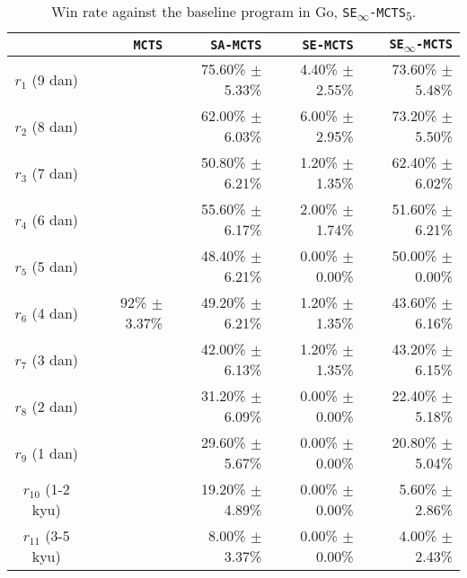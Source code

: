 \begin{table}[b]
        \centering
        \caption{Win rate against the baseline program in Go, \texttt{SE\textsubscript{$\infty$}-MCTS\textsubscript{$5$}}.}
        \begin{small}
        \begin{tabular}{crrrr}
            \toprule
            & \texttt{MCTS} & \texttt{SA-MCTS} & \texttt{SE-MCTS} & \texttt{SE\textsubscript{$\infty$}-MCTS} \\
            \midrule
            $r_1$ (9 dan) & \multirow{11}{*}{92\% \(\pm\) 3.37\%} & 75.60\% \(\pm\) 5.33\% & 4.40\% \(\pm\) 2.55\% &73.60\% \(\pm\) 5.48\%\\ 
            $r_2$ (8 dan) & & 62.00\% \(\pm\) 6.03\% & 6.00\% \(\pm\) 2.95\% &73.20\% \(\pm\) 5.50\%\\
            $r_3$ (7 dan) & & 50.80\% \(\pm\) 6.21\% & 1.20\% \(\pm\) 1.35\% & 62.40\% \(\pm\) 6.02\%\\ 
            $r_4$ (6 dan) & & 55.60\% \(\pm\) 6.17\% & 2.00\% \(\pm\) 1.74\% & 51.60\% \(\pm\) 6.21\%\\
            $r_5$ (5 dan) & & 48.40\% \(\pm\) 6.21\% & 0.00\% \(\pm\) 0.00\% &50.00\% \(\pm\) 0.00\%\\
            $r_6$ (4 dan) & & 49.20\% \(\pm\) 6.21\% & 1.20\% \(\pm\) 1.35\% & 43.60\% \(\pm\) 6.16\%\\ 
            $r_7$ (3 dan) & & 42.00\% \(\pm\) 6.13\% & 1.20\% \(\pm\) 1.35\% &43.20\% \(\pm\) 6.15\%\\
            $r_8$ (2 dan) & & 31.20\% \(\pm\) 6.09\% & 0.00\% \(\pm\) 0.00\% &22.40\% \(\pm\) 5.18\%\\
            $r_9$ (1 dan) & & 29.60\% \(\pm\) 5.67\% & 0.00\% \(\pm\) 0.00\% &20.80\% \(\pm\) 5.04\%\\ 
            $r_{10}$ (1-2 kyu) & & 19.20\% \(\pm\) 4.89\% & 0.00\% \(\pm\) 0.00\% &5.60\% \(\pm\) 2.86\%\\ 
            $r_{11}$ (3-5 kyu) & & 8.00\% \(\pm\) 3.37\% & 0.00\% \(\pm\) 0.00\% &4.00\% \(\pm\) 2.43\%\\ 
            \bottomrule    
        \end{tabular}
        \end{small}
        \label{tbl:bs_mcts}
\end{table}







